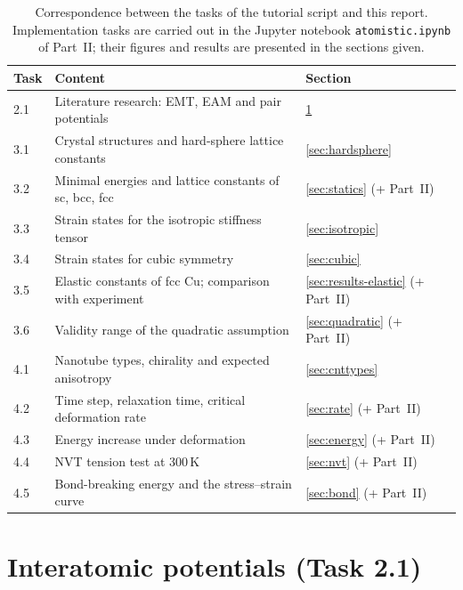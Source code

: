 \documentclass[11pt,a4paper]{article}
\numberwithin{equation}{section}
\theoremstyle{remark}
\begin{document}
\begin{table}[ht]
  \centering
  \caption{Correspondence between the tasks of the tutorial script and this report. Implementation
    tasks are carried out in the Jupyter notebook \texttt{atomistic.ipynb} of Part~II; their figures and
    results are presented in the sections given.}
  \label{tab:taskmap}
  \begin{tabularx}{\linewidth}{lXl}
    \toprule
    Task & Content & Section \\
    \midrule
    2.1 & Literature research: EMT, EAM and pair potentials & \ref{sec:potentials} \\
    3.1 & Crystal structures and hard-sphere lattice constants & \ref{sec:hardsphere} \\
    3.2 & Minimal energies and lattice constants of sc, bcc, fcc & \ref{sec:statics} (+ Part~II) \\
    3.3 & Strain states for the isotropic stiffness tensor & \ref{sec:isotropic} \\
    3.4 & Strain states for cubic symmetry & \ref{sec:cubic} \\
    3.5 & Elastic constants of fcc Cu; comparison with experiment & \ref{sec:results-elastic} (+ Part~II) \\
    3.6 & Validity range of the quadratic assumption & \ref{sec:quadratic} (+ Part~II) \\
    4.1 & Nanotube types, chirality and expected anisotropy & \ref{sec:cnttypes} \\
    4.2 & Time step, relaxation time, critical deformation rate & \ref{sec:rate} (+ Part~II) \\
    4.3 & Energy increase under deformation & \ref{sec:energy} (+ Part~II) \\
    4.4 & NVT tension test at 300\,K & \ref{sec:nvt} (+ Part~II) \\
    4.5 & Bond-breaking energy and the stress--strain curve & \ref{sec:bond} (+ Part~II) \\
    \bottomrule
  \end{tabularx}
\end{table}

\section{Interatomic potentials (Task 2.1)}\label{sec:potentials}
\end{document}

